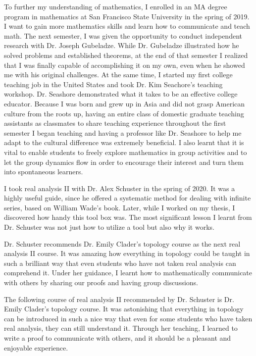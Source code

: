\documentclass[10pt]{amsart}
\begin{document}
To further my understanding of mathematics, I enrolled in an MA degree program in mathematics at San Francisco State University in the spring of 2019. I want to gain more mathematics skills and learn how to communicate and teach math. The next semester, I was given the opportunity to conduct independent research with Dr. Joseph Gubeladze. While Dr. Gubeladze illustrated how he solved problems and established theorems, at the end of that semester I realized that I was finally capable of accomplishing it on my own, even when he showed me with his original challenges. At the same time, I started my first college teaching job in the United States and took Dr. Kim Seachore's teaching workshop. Dr. Seashore demonstrated what it takes to be an effective college educator. Because I was born and grew up in Asia and did not grasp American culture from the roots up, having an entire class of domestic graduate teaching assistants as classmates to share teaching experience throughout the first semester I began teaching and having a professor like Dr. Seashore to help me adapt to the cultural difference was extremely beneficial. I also learnt that it is vital to enable students to freely explore mathematics in group activities and to let the group dynamics flow in order to encourage their interest and turn them into spontaneous learners.


I took real analysis II with Dr. Alex Schuster in the spring of 2020. It was a highly useful guide, since he offered a systematic method for dealing with infinite series, based on William Wade's book. Later, while I worked on my thesis, I discovered how handy this tool box was. The most significant lesson I learnt from Dr. Schuster was not just how to utilize a tool but also why it works.

Dr. Schuster recommends Dr. Emily Clader's topology course as the next real analysis II course. It was amazing how everything in topology could be taught in such a brilliant way that even students who have not taken real analysis can comprehend it. Under her guidance, I learnt how to mathematically communicate with others by sharing our proofs and having group discussions.

The following course of real analysis II recommended by Dr. Schuster is Dr. Emily Clader’s topology course. It was astonishing that everything in topology can be introduced in such a nice way that even for some students who have taken real analysis, they can still understand it. Through her teaching, I learned to write a proof to communicate with others, and it should be a pleasant and enjoyable experience.
\end{document}
